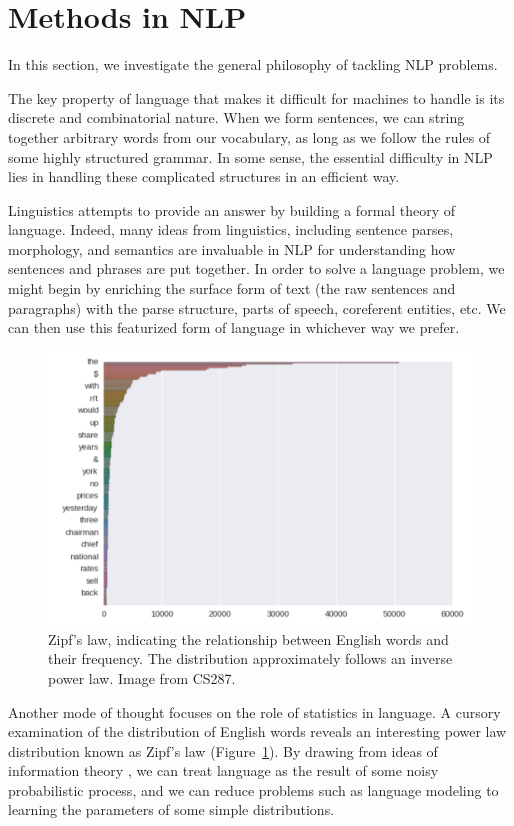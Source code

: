 \documentclass[12pt]{report}
\begin{document}
\section{Methods in NLP}

In this section, we investigate the general philosophy of tackling NLP problems.

The key property of language that makes it difficult for machines to handle is its discrete and combinatorial nature. When we form sentences, we can string together arbitrary words from our vocabulary, as long as we follow the rules of some highly structured grammar. In some sense, the essential difficulty in NLP lies in handling these complicated structures in an efficient way.

Linguistics attempts to provide an answer by building a formal theory of language. Indeed, many ideas from linguistics, including sentence parses, morphology, and semantics are invaluable in NLP for understanding how sentences and phrases are put together.
In order to solve a language problem, we might begin by enriching the surface form of text (the raw sentences and paragraphs) with the parse structure, parts of speech, coreferent entities, etc. We can then use this featurized form of language in whichever way we prefer.

\begin{figure}[t]
\centering
\includegraphics[scale=0.5]{images/zipf}
\caption[Zipf's Law]{Zipf's law, indicating the relationship between English words and their frequency. The distribution approximately follows an inverse power law. Image from CS287.}
\label{fig:zipf}
\end{figure}

Another mode of thought focuses on the role of statistics in language. A cursory examination of the distribution of English words reveals an interesting power law distribution known as Zipf's law (Figure~\ref{fig:zipf}). By drawing from ideas of information theory \citep{Shannon1948}, we can treat language as the result of some noisy probabilistic process, and we can reduce problems such as language modeling to learning the parameters of some simple distributions.
\end{document}

